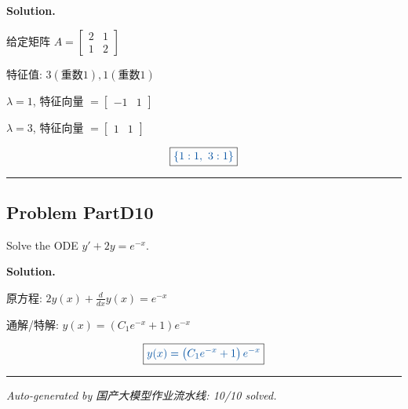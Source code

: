 \documentclass[11pt, a4paper]{ctexart}
\newcommand{\problem}[1]{\subsection*{Problem #1}}
\newcommand{\solution}{\par\noindent\textbf{Solution.}\par\smallskip}
\begin{document}
\solution
给定矩阵 $A = \left[\begin{matrix}2 & 1\\1 & 2\end{matrix}\right]$

特征值: $3 (重数 1), 1 (重数 1)$

$\lambda = 1$, 特征向量 $= \left[\begin{matrix}-1 & 1\end{matrix}\right]$

$\lambda = 3$, 特征向量 $= \left[\begin{matrix}1 & 1\end{matrix}\right]$

\[\boxed{\textcolor{anscolor}{\left\{ 1 : 1, \  3 : 1\right\}}}\]

\vspace{0.6em}\hrule\vspace{0.6em}
\problem{PartD10}

Solve the ODE $y' + 2y = e^{-x}$.

\solution
原方程: $2 y{\left(x \right)} + \frac{d}{d x} y{\left(x \right)} = e^{- x}$

通解/特解: $y{\left(x \right)} = \left(C_{1} e^{- x} + 1\right) e^{- x}$

\[\boxed{\textcolor{anscolor}{y{\left(x \right)} = \left(C_{1} e^{- x} + 1\right) e^{- x}}}\]

\vspace{0.6em}\hrule\vspace{0.6em}
\vspace{1em}\noindent\textit{Auto-generated by 国产大模型作业流水线: 10/10 solved.}
\end{document}
